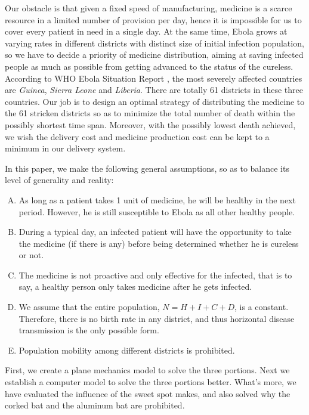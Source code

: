 \documentclass[12pt,a4paper,titlepage]{article}
\begin{document}
Our obstacle is that given a fixed speed of manufacturing, medicine is a scarce resource in a limited number of provision per day, hence it is impossible for us to cover every patient in need in a single day. At the same time, Ebola grows at varying rates in different districts with distinct size of initial infection population, so we have to decide a priority of medicine distribution, aiming at saving infected people as much as possible from getting advanced to the status of the cureless. According to WHO Ebola Situation Report \cite{ebolaReport20140204}, the most severely affected countries are \emph{Guinea}, \emph{Sierra Leone} and \emph{Liberia}. There are totally 61 districts in these three countries. Our job is to design an optimal strategy of distributing the medicine to the 61 stricken districts so as to minimize the total number of death within the possibly shortest time span. Moreover, with the possibly lowest death achieved, we wish the delivery cost and medicine production cost can be kept to a minimum in our delivery system.


In this paper, we make the following general assumptions, so as to balance its level of generality and reality:
\begin{enumerate} [D. 1]
	\item As long as a patient takes 1 unit of medicine, he will be healthy in the next period. However, he is still susceptible to Ebola as all other healthy people.
	\item During a typical day, an infected patient will have the opportunity to take the medicine (if there is any) before being determined whether he is cureless or not. 
	\item The medicine is not proactive and only effective for the infected, that is to say, a healthy person only takes medicine after he gets infected. 
	\item We assume that the entire population, $N=H+I+C+D$, is a constant. Therefore, there is no birth rate in any district, and thus horizontal disease transmission is the only possible form. 
	\item Population mobility among different districts is prohibited.
\end{enumerate}

First, we create a plane mechanics model to solve the three portions. Next we establish a computer model to solve the three portions better. What's more, we have evaluated the influence of the sweet spot makes, and also solved why the corked bat and the aluminum bat are prohibited.
\end{document}
